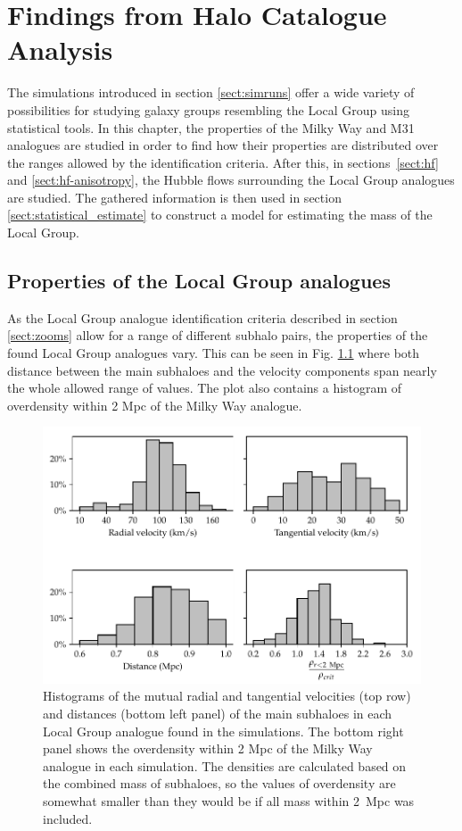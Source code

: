 \documentclass[english, twoside]{HYgradu}
\begin{document}
\chapter{Findings from Halo Catalogue Analysis} \label{chapt:results}
The simulations introduced in section \ref{sect:simruns} offer a wide variety of possibilities for studying galaxy groups resembling the Local Group using statistical tools. In this chapter, the properties of the Milky Way and M31 analogues are studied in order to find how their properties are distributed over the ranges allowed by the identification criteria. After this, in sections~\ref{sect:hf} and \ref{sect:hf-anisotropy}, the Hubble flows surrounding the Local Group analogues are studied. The gathered information is then used in section \ref{sect:statistical_estimate} to construct a model for estimating the mass of the Local Group.

\section{Properties of the Local Group analogues} \label{sect:properties_of_LGs}
As the Local Group analogue identification criteria described in section \ref{sect:zooms} allow for a range of different subhalo pairs, the properties of the found Local Group analogues vary. This can be seen in Fig. \ref{fig:LGproperties} where both distance between the main subhaloes and the velocity components span nearly the whole allowed range of values. The plot also contains a histogram of overdensity within 2 Mpc of the Milky Way analogue.

\begin{figure}
    \centering
    \includegraphics{kuvat/LGproperties.pdf}
    \caption{Histograms of the mutual radial and tangential velocities (top row) and distances (bottom left panel) of the main subhaloes in each Local Group analogue found in the simulations. The bottom right panel shows the overdensity within 2 Mpc of the Milky Way analogue in each simulation. The densities are calculated based on the combined mass of subhaloes, so the values of overdensity are somewhat smaller than they would be if all mass within 2~Mpc was included.}\label{fig:LGproperties}
\end{figure}
\end{document}
